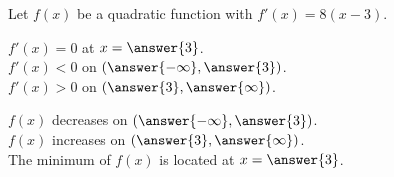 \documentclass{ximera}
\author{Lee Wayand}
\begin{document}
\begin{exercise} 









Let $f(x)$ be a quadratic function with $f'(x) = 8(x-3)$. \\






\begin{question}



$f'(x) = 0$  at  $x = \answer{3}$. \\


$f'(x) < 0$ on $\left( \answer{-\infty}, \answer{3} \right)$. \\


$f'(x) > 0$ on $\left( \answer{3}, \answer{\infty} \right)$. \\

\end{question}





\begin{question}



$f(x)$ decreases on $\left( \answer{-\infty}, \answer{3} \right)$. \\


$f(x)$ increases on $\left( \answer{3}, \answer{\infty} \right)$. \\


The minimum of $f(x)$ is located at  $x = \answer{3}$. \\

\end{question}
















\end{exercise}
\end{document}
